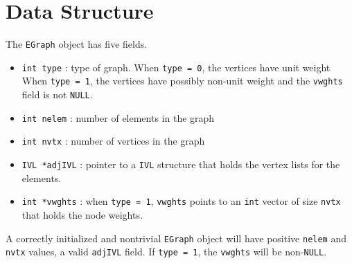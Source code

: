 \par
\section{Data Structure}
\par
The {\tt EGraph} object has five fields.
\begin{itemize}
\item {\tt int type} : 
type of graph. 
When {\tt type = 0}, the vertices have unit weight
When {\tt type = 1}, the vertices have possibly non-unit weight
and the {\tt vwghts} field is not {\tt NULL}.
\item {\tt int nelem} : 
number of elements in the graph
\item {\tt int nvtx} : 
number of vertices in the graph
\item {\tt IVL *adjIVL} : 
pointer to a {\tt IVL} structure that holds the vertex lists for
the elements.
\item {\tt int  *vwghts} : 
when {\tt type = 1}, {\tt vwghts}
points to an {\tt int} vector of size {\tt nvtx}
that holds the
node weights.
\end{itemize}
A correctly initialized and nontrivial {\tt EGraph} object 
will have positive {\tt nelem} and {\tt nvtx} values,
a valid {\tt adjIVL} field.
If {\tt type = 1}, the {\tt vwghts} will be non-{\tt NULL}.
